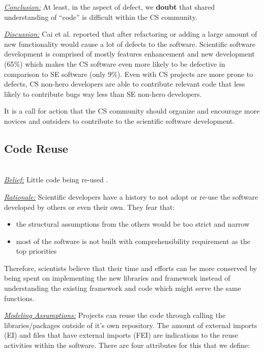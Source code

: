 \documentclass[sigconf,review,anonymous]{acmart}
\newcommand{\bi}{\begin{itemize}}
\newcommand{\ei}{\end{itemize}}
\newenvironment{RQ}{\vspace{1mm}\begin{tcolorbox}[enhanced,width=3.4in,size=fbox,colback=red!5!white,drop shadow southwest,sharp corners]}{\end{tcolorbox}}
\begin{document}
\begin{RQ}
\textit{\underline{Conclusion:}} At least, in the aspect of defect, we \textbf{doubt} that shared understanding of ``code'' is difficult within the CS community.
\end{RQ}

\noindent \textit{\underline{Discussion:}} Cai et al. \cite{cai19_debt} reported that after refactoring or adding a large amount of new functionality would cause a lot of defects to the software. Scientific software development is comprised of mostly features enhancement and new development (65\%) which makes the CS software even more likely to be defective in comparison to SE software (only 9\%). Even with CS projects are more prone to defects, CS non-hero developers are able to contribute relevant code that less likely to contribute bugs way less than SE non-hero developers.  

It is a call for action that the CS community should organize and encourage more novices and outsiders to contribute to the scientific software development. 




\subsection{Code Reuse} ~\\
\noindent \textit{\underline{Belief:}} Little code being re-used \cite{segal07_problem, carver06_hpc, Shull05_parallel, sanders08_risk}. 

\noindent \textit{\underline{Rationale:}} 
Scientific developers have a history to not adopt or re-use the software developed by others or even their own. They fear that: 

\bi
\item the structural assumptions from the others would be too strict and narrow \cite{carver06_hpc, basili08_hpc}
\item most of the software is not built with comprehensibility requirement as the top priorities \cite{segal07_problem}
\ei

Therefore, scientists believe that their time and efforts can be more conserved by being spent on implementing the new libraries and framework instead of understanding the existing framework and code which might serve the same functions.  

\noindent \textit{\underline{Modeling Assumptions:}} Projects can reuse the code through calling the libraries/packages outside of it's own repository. The amount of external imports (EI) and files that have external imports (FEI) are indications to the reuse activities within the software. There are four attributes for this that we define: 
\end{document}
